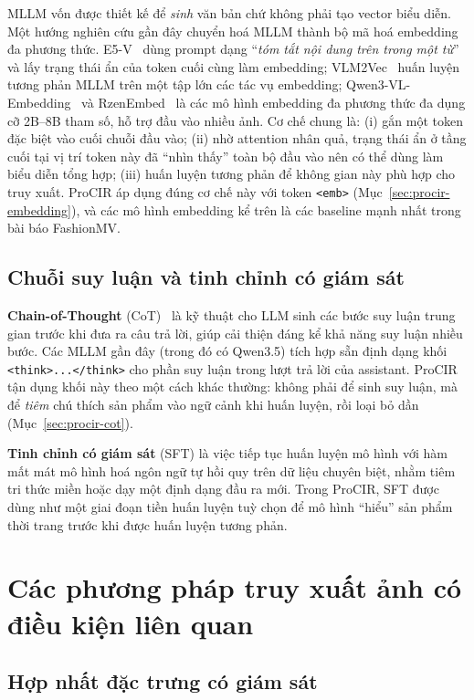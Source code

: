 MLLM vốn được thiết kế để \emph{sinh} văn bản chứ không phải tạo vector biểu diễn. Một hướng nghiên cứu gần đây chuyển hoá MLLM thành bộ mã hoá embedding đa phương thức. E5-V~\cite{jiang2024e5v} dùng prompt dạng ``\emph{tóm tắt nội dung trên trong một từ}'' và lấy trạng thái ẩn của token cuối cùng làm embedding; VLM2Vec~\cite{jiang2025vlm2vec} huấn luyện tương phản MLLM trên một tập lớn các tác vụ embedding; Qwen3-VL-Embedding~\cite{li2026qwen3vlemb} và RzenEmbed~\cite{jian2025rzenembed} là các mô hình embedding đa phương thức đa dụng cỡ 2B--8B tham số, hỗ trợ đầu vào nhiều ảnh. Cơ chế chung là: (i) gắn một token đặc biệt vào cuối chuỗi đầu vào; (ii) nhờ attention nhân quả, trạng thái ẩn ở tầng cuối tại vị trí token này đã ``nhìn thấy'' toàn bộ đầu vào nên có thể dùng làm biểu diễn tổng hợp; (iii) huấn luyện tương phản để không gian này phù hợp cho truy xuất. ProCIR áp dụng đúng cơ chế này với token \texttt{<emb>} (Mục~\ref{sec:procir-embedding}), và các mô hình embedding kể trên là các baseline mạnh nhất trong bài báo FashionMV.

\subsection{Chuỗi suy luận và tinh chỉnh có giám sát}

\textbf{Chain-of-Thought} (CoT)~\cite{wei2022cot} là kỹ thuật cho LLM sinh các bước suy luận trung gian trước khi đưa ra câu trả lời, giúp cải thiện đáng kể khả năng suy luận nhiều bước. Các MLLM gần đây (trong đó có Qwen3.5) tích hợp sẵn định dạng khối \texttt{<think>...</think>} cho phần suy luận trong lượt trả lời của assistant. ProCIR tận dụng khối này theo một cách khác thường: không phải để sinh suy luận, mà để \emph{tiêm} chú thích sản phẩm vào ngữ cảnh khi huấn luyện, rồi loại bỏ dần (Mục~\ref{sec:procir-cot}).

\textbf{Tinh chỉnh có giám sát} (SFT) là việc tiếp tục huấn luyện mô hình với hàm mất mát mô hình hoá ngôn ngữ tự hồi quy trên dữ liệu chuyên biệt, nhằm tiêm tri thức miền hoặc dạy một định dạng đầu ra mới. Trong ProCIR, SFT được dùng như một giai đoạn tiền huấn luyện tuỳ chọn để mô hình ``hiểu'' sản phẩm thời trang trước khi được huấn luyện tương phản.

\section{Các phương pháp truy xuất ảnh có điều kiện liên quan}\label{sec:related-cir}

\subsection{Hợp nhất đặc trưng có giám sát}

